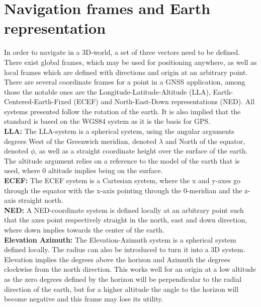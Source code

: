\section{Navigation frames and Earth representation}
In order to navigate in a 3D-world, a set of three vectors need to be defined. There exist global frames, which may be used for positioning anywhere, as well as local frames which are defined with directions and origin at an arbitrary point. There are several coordinate frames for a point in a GNSS application, among those the notable ones are the Longitude-Latitude-Altitude (LLA), Earth-Centered-Earth-Fixed (ECEF) and North-East-Down representations (NED). All systems presented follow the rotation of the earth. It is also implied that the standard is based on the WGS84 system as it is the basis for GPS.\\
\textbf{LLA:}
The LLA-system is a spherical system, using the angular arguments degrees West of the Greenwich meridian, denoted $\lambda$ and North of the equator, denoted $\phi$, as well as a straight coordinate height over the surface of the earth. The altitude argument relies on a reference to the model of the earth that is used, where 0 altitude implies being on the surface. \\
\textbf{ECEF:} The ECEF system is a Cartesian system, where the x and y-axes go through the equator with the x-axis pointing through the 0-meridian and the z-axis straight north.\\
\textbf{NED:} A NED-coordinate system is defined locally at an arbitrary point such that the axes point respectively straight in the north, east and down direction, where down implies towards the center of the earth.\\
\textbf{Elevation Azimuth:}
The Elevation-Azimuth system is a spherical system defined locally. The radius can also be introduced to turn it into a 3D system. Elevation implies the degrees above the horizon and Azimuth the degrees clockwise from the north direction. This works well for an origin at a low altitude as the zero degrees defined by the horizon will be perpendicular to the radial direction of the earth, but for a higher altitude the angle to the horizon will become negative and this frame may lose its utility.

